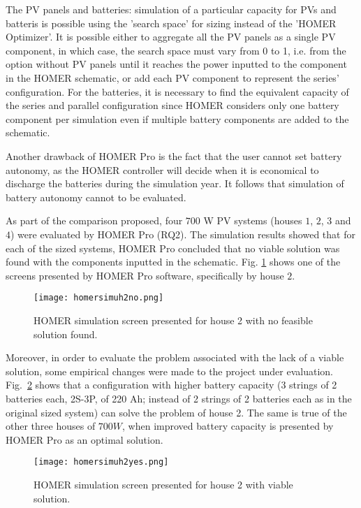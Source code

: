 The PV panels and batteries: simulation of a particular capacity for PVs and batteris is possible using the 'search space' for sizing instead of the 'HOMER Optimizer'. It is possible either to aggregate all the PV panels as a single PV component, in which case, the search space must vary from 0 to 1, i.e. from the option without PV panels until it reaches the power inputted to the component in the HOMER schematic, or add each PV component to represent the series' configuration. For the batteries, it is necessary to find the equivalent capacity of the series and parallel configuration since HOMER considers only one battery component per simulation even if multiple battery components are added to the schematic.

Another drawback of HOMER Pro is the fact that the user cannot set battery autonomy, as the HOMER controller will decide when it is economical to discharge the batteries during the simulation year. It follows that simulation of battery autonomy cannot to be evaluated.

As part of the comparison proposed, four $700$ W PV systems (houses $1$, $2$, $3$ and $4$) were evaluated by HOMER Pro (RQ2). The simulation results showed that for each of the sized systems, HOMER Pro concluded that no viable solution was found with the components inputted in the schematic. Fig. \ref{fig:homersimuh2no} shows one of the screens presented by HOMER Pro software, specifically by house $2$.

\begin{figure}[h]
\texttt{[image: homersimuh2no.png]}
\centering
\caption{HOMER simulation screen presented for house 2 with no feasible solution found.}
\label{fig:homersimuh2no}
\end{figure}

Moreover, in order to evaluate the problem associated with the lack of a viable solution, some empirical changes were made to the  project under evaluation. Fig.~\ref{fig:homersimuh2yes} shows that a configuration with higher battery capacity (3 strings of 2 batteries each, 2S-3P, of 220 Ah; instead of 2 strings of 2 batteries each as in the original sized system) can solve the problem of house 2. The same is true of the other three houses of $700 W$, when improved battery capacity is presented by HOMER Pro as an optimal solution.

\begin{figure}[h]
\texttt{[image: homersimuh2yes.png]}
\centering
\caption{HOMER simulation screen presented for house 2 with viable solution.}
\label{fig:homersimuh2yes}
\end{figure}

